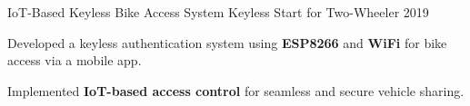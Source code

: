 

\begin{cventries}


  \cventry
    {IoT-Based Keyless Bike Access System} %
    {Keyless Start for Two-Wheeler} %
    {}%
    {2019} %
    {
      \begin{cvitems} %
        \item {Developed a keyless authentication system using \textbf{ESP8266} and \textbf{WiFi} for bike access via a mobile app.}
        \item {Implemented \textbf{IoT-based access control} for seamless and secure vehicle sharing.}
      \end{cvitems}
    }



\end{cventries}
